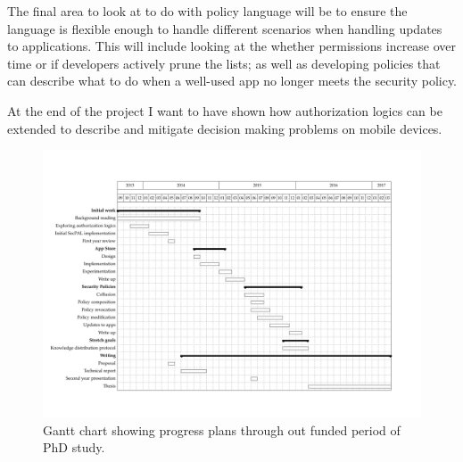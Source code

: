 \documentclass[a4paper,12pt,sfsidenotes]{tufte-book}
\begin{document}
The final area to look at to do with policy language will be to ensure the language
is flexible enough to handle different scenarios when handling updates to
applications.  This will include looking at the whether permissions increase
over time or if developers actively prune the lists; as well as developing
policies that can describe what to do when a well-used app no longer meets the
security policy.


At the end of the project I want to have shown how authorization logics can be
extended to describe and mitigate decision making problems on mobile devices.

\begin{figure}\label{fig:gantt}
  \includegraphics[width=1.4\linewidth,angle=90]{gantt.pdf}
  \caption{Gantt chart showing progress plans through out funded period of PhD
  study.}
\end{figure}



\appendix

\end{document}
